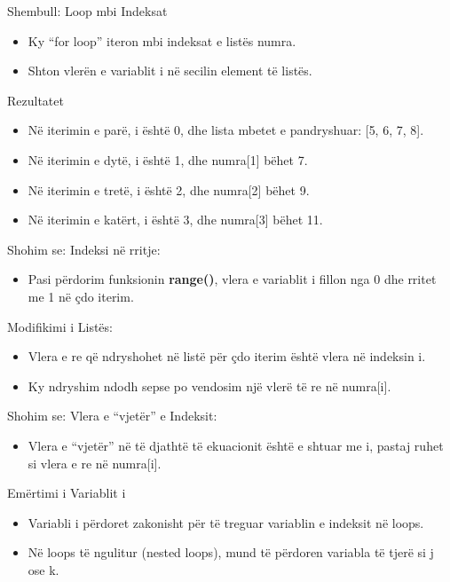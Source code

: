 \documentclass[
  ignorenonframetext,
]{beamer}
\providecommand{\tightlist}{%
  \setlength{\itemsep}{0pt}\setlength{\parskip}{0pt}}
\begin{document}
\begin{frame}{Shembull: Loop mbi Indeksat}
\protect\hypertarget{shembull-loop-mbi-indeksat-1}{}
\begin{itemize}
\item
  Ky ``for loop'' iteron mbi indeksat e listës numra.
\item
  Shton vlerën e variablit i në secilin element të listës.
\end{itemize}
\end{frame}

\begin{frame}{Rezultatet}
\protect\hypertarget{rezultatet}{}
\begin{itemize}
\item
  Në iterimin e parë, i është 0, dhe lista mbetet e pandryshuar: {[}5,
  6, 7, 8{]}.
\item
  Në iterimin e dytë, i është 1, dhe numra{[}1{]} bëhet 7.
\item
  Në iterimin e tretë, i është 2, dhe numra{[}2{]} bëhet 9.
\item
  Në iterimin e katërt, i është 3, dhe numra{[}3{]} bëhet 11.
\end{itemize}
\end{frame}

\begin{frame}{Shohim se:}
\protect\hypertarget{shohim-se}{}
Indeksi në rritje:

\begin{itemize}
\tightlist
\item
  Pasi përdorim funksionin \textbf{range()}, vlera e variablit i fillon
  nga 0 dhe rritet me 1 në çdo iterim.
\end{itemize}

Modifikimi i Listës:

\begin{itemize}
\item
  Vlera e re që ndryshohet në listë për çdo iterim është vlera në
  indeksin i.
\item
  Ky ndryshim ndodh sepse po vendosim një vlerë të re në numra{[}i{]}.
\end{itemize}
\end{frame}

\begin{frame}{Shohim se:}
\protect\hypertarget{shohim-se-1}{}
Vlera e ``vjetër'' e Indeksit:

\begin{itemize}
\tightlist
\item
  Vlera e ``vjetër'' në të djathtë të ekuacionit është e shtuar me i,
  pastaj ruhet si vlera e re në numra{[}i{]}.
\end{itemize}

Emërtimi i Variablit i

\begin{itemize}
\item
  Variabli i përdoret zakonisht për të treguar variablin e indeksit në
  loops.
\item
  Në loops të ngulitur (nested loops), mund të përdoren variabla të
  tjerë si j ose k.
\end{itemize}
\end{frame}
\end{document}
